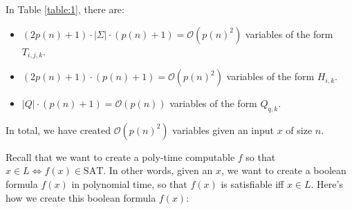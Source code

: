 \documentclass[10pt]{article}
\begin{document}
\newpage

In Table \ref{table:1}, there are:
\begin{itemize}
	\item $(2p(n) + 1) \cdot |\Sigma| \cdot (p(n) + 1) = \mathcal O(p(n)^2)$ variables of the form $T_{i, j, k}$.
	\item $(2p(n) + 1) \cdot (p(n) + 1) = \mathcal O(p(n)^2)$ variables of the form $H_{i, k}$.
	\item $|Q| \cdot (p(n) + 1) = \mathcal O(p(n))$ variables of the form $Q_{q, k}$.
\end{itemize}
In total, we have created $\mathcal O(p(n)^2)$ variables given an input $x$ of size $n$.


Recall that we want to create a poly-time computable $f$ so that $x \in L \Leftrightarrow f(x) \in \mathrm{SAT}$. In other words, given an $x$, we want to create a boolean formula $f(x)$ in polynomial time, so that $f(x)$ is satisfiable iff $x \in L$. Here's how we create this boolean formula $f(x)$:
\end{document}

